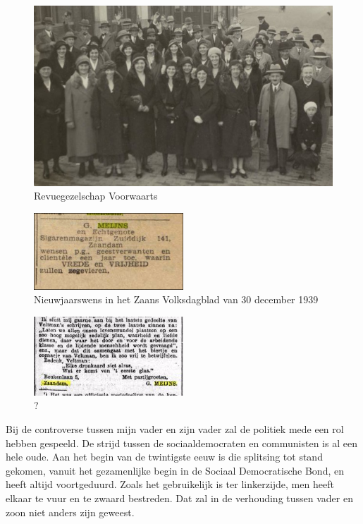 \documentclass[12pt,twoside]{memoir}
\begin{document}
\begin{figure}
\includegraphics[width=\textwidth]{img/ch2/ch2-afb08}
\caption*{\footnotesize Revuegezelschap Voorwaarts}
\end{figure}


\begin{figure}
\includegraphics[width=0.5\textwidth]{img/ch2/ch2-afb09}
\caption*{\footnotesize Nieuwjaarswens in het Zaans Volksdagblad van 30 december 1939}
\end{figure}

\begin{figure}
\includegraphics[width=0.5\textwidth]{img/ch2/ch2-afb10}
\caption*{\footnotesize ?}
\end{figure}

Bij de controverse tussen mijn vader en zijn vader zal de politiek mede een rol hebben gespeeld. De strijd tussen de sociaaldemocraten en communisten is al een hele oude. Aan het begin van de twintigste eeuw is die splitsing tot stand gekomen, vanuit het gezamenlijke begin in de Sociaal Democratische Bond, en heeft altijd voortgeduurd. Zoals het gebruikelijk is ter linkerzijde, men heeft elkaar te vuur en te zwaard bestreden. Dat zal in de verhouding tussen vader en zoon niet anders zijn geweest. 
\end{document}
